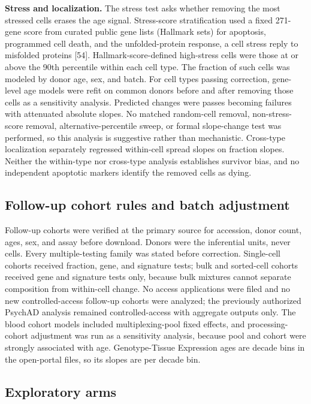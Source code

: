 \documentclass[11pt]{article}
\begin{document}
\textbf{Stress and localization.} The stress test asks whether removing the most stressed cells erases the age signal. Stress-score stratification used a fixed 271-gene score from curated public gene lists (Hallmark sets) for apoptosis, programmed cell death, and the unfolded-protein response, a cell stress reply to misfolded proteins [54]. Hallmark-score-defined high-stress cells were those at or above the 90th percentile within each cell type. The fraction of such cells was modeled by donor age, sex, and batch. For cell types passing correction, gene-level age models were refit on common donors before and after removing those cells as a sensitivity analysis. Predicted changes were passes becoming failures with attenuated absolute slopes. No matched random-cell removal, non-stress-score removal, alternative-percentile sweep, or formal slope-change test was performed, so this analysis is suggestive rather than mechanistic. Cross-type localization separately regressed within-cell spread slopes on fraction slopes. Neither the within-type nor cross-type analysis establishes survivor bias, and no independent apoptotic markers identify the removed cells as dying.


\subsection*{Follow-up cohort rules and batch adjustment}

Follow-up cohorts were verified at the primary source for accession, donor count, ages, sex, and assay before download. Donors were the inferential units, never cells. Every multiple-testing family was stated before correction. Single-cell cohorts received fraction, gene, and signature tests; bulk and sorted-cell cohorts received gene and signature tests only, because bulk mixtures cannot separate composition from within-cell change. No access applications were filed and no new controlled-access follow-up cohorts were analyzed; the previously authorized PsychAD analysis remained controlled-access with aggregate outputs only. The blood cohort models included multiplexing-pool fixed effects, and processing-cohort adjustment was run as a sensitivity analysis, because pool and cohort were strongly associated with age. Genotype-Tissue Expression ages are decade bins in the open-portal files, so its slopes are per decade bin.

\subsection*{Exploratory arms}
\end{document}
